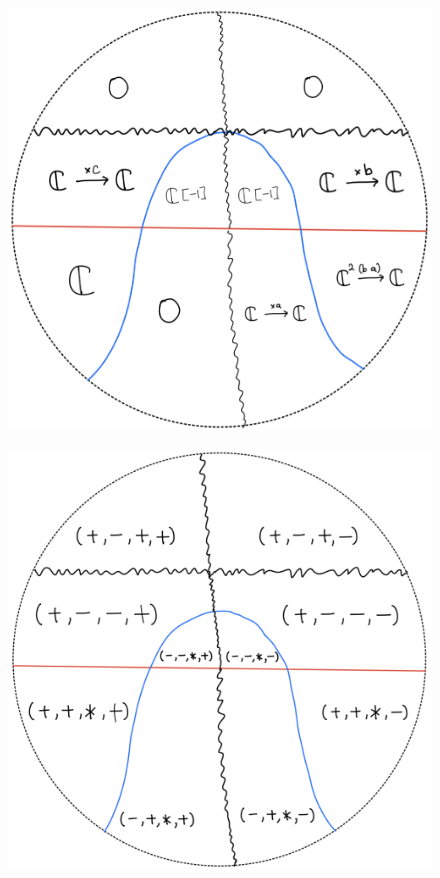 \begin{figure}[H]
    \centering
    \includegraphics[scale = 0.45]{diagrams/cobord'2/33.png} 
    \caption{}
    \label{fig:your-label}
\end{figure}
\begin{figure}[H]
    \centering
    \includegraphics[scale = 0.45]{diagrams/cobord'2/34.png} 
    \caption{}
    \label{fig:your-label}
\end{figure}
